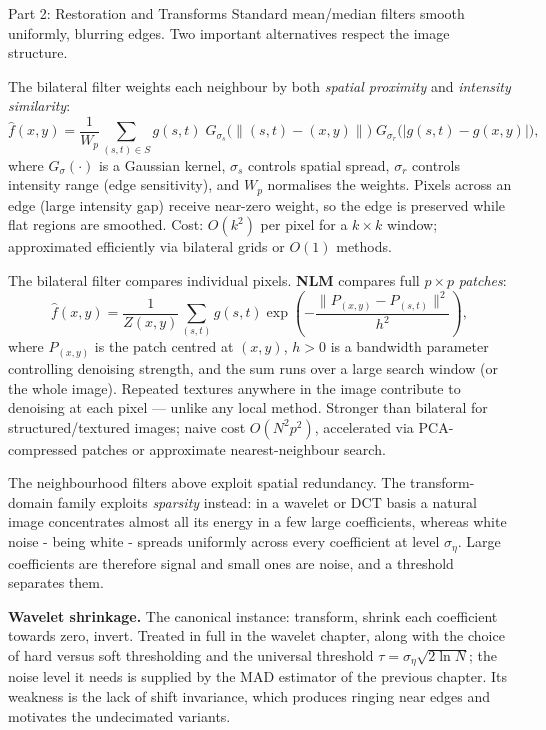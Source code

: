 \documentclass[letterpaper]{article}
\begin{document}
\begin{notes}{Part 2: Restoration and Transforms}
Standard mean/median filters smooth uniformly, blurring edges. Two important alternatives respect the image structure.


The bilateral filter weights each neighbour by both \emph{spatial proximity} and \emph{intensity similarity}:
$$\hat{f}(x,y) = \frac{1}{W_p}\!\sum_{(s,t)\in S}g(s,t)\;G_{\sigma_s}\!\bigl(\|(s,t)-(x,y)\|\bigr)\;G_{\sigma_r}\!\bigl(|g(s,t)-g(x,y)|\bigr),$$
where $G_\sigma(\cdot)$ is a Gaussian kernel, $\sigma_s$ controls spatial spread, $\sigma_r$ controls intensity range (edge sensitivity), and $W_p$ normalises the weights. Pixels across an edge (large intensity gap) receive near-zero weight, so the edge is preserved while flat regions are smoothed. Cost: $O(k^2)$ per pixel for a $k\times k$ window; approximated efficiently via bilateral grids or $O(1)$ methods.


The bilateral filter compares individual pixels. \textbf{NLM} compares full $p\times p$ \emph{patches}:
$$\hat{f}(x,y) = \frac{1}{Z(x,y)}\!\sum_{(s,t)}\!g(s,t)\exp\!\left(-\frac{\|P_{(x,y)}-P_{(s,t)}\|^2}{h^2}\right),$$
where $P_{(x,y)}$ is the patch centred at $(x,y)$, $h>0$ is a bandwidth parameter controlling denoising strength, and the sum runs over a large search window (or the whole image). Repeated textures anywhere in the image contribute to denoising at each pixel — unlike any local method. Stronger than bilateral for structured/textured images; naive cost $O(N^2 p^2)$, accelerated via PCA-compressed patches or approximate nearest-neighbour search.


The neighbourhood filters above exploit spatial redundancy. The transform-domain family exploits \emph{sparsity} instead: in a wavelet or DCT basis a natural image concentrates almost all its energy in a few large coefficients, whereas white noise - being white - spreads uniformly across every coefficient at level $\sigma_\eta$. Large coefficients are therefore signal and small ones are noise, and a threshold separates them.

\textbf{Wavelet shrinkage.} The canonical instance: transform, shrink each coefficient towards zero, invert. Treated in full in the wavelet chapter, along with the choice of hard versus soft thresholding and the universal threshold $\tau=\sigma_\eta\sqrt{2\ln N}$; the noise level it needs is supplied by the MAD estimator of the previous chapter. Its weakness is the lack of shift invariance, which produces ringing near edges and motivates the undecimated variants.


\end{notes}
\end{document}
